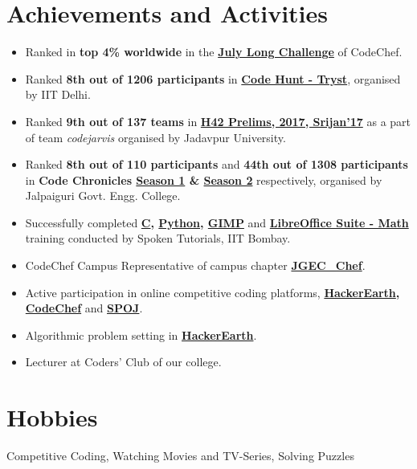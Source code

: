 \documentclass[margin, centered]{res}
\begin{document}
\begin{resume}
\begin{itemize}[leftmargin=*]
\end{itemize}


\section{Achievements and Activities}
\begin{itemize}[leftmargin=*]
	\item
	Ranked in \textbf{top 4\% worldwide} in the \textbf{\href{https://www.codechef.com/JULY17}{July Long Challenge}} of CodeChef.
	\item
	Ranked \textbf{8th out of 1206 participants} in \textbf{\href{https://www.hackerearth.com/challenge/college/code-hunt-tryst/leaderboard/}{Code Hunt - Tryst}}, organised by IIT Delhi.
	\item
	Ranked \textbf{9th out of 137 teams} in \textbf{\href{https://www.hackerrank.com/contests/h42-prelims-srijan17/leaderboard}{H42 Prelims, 2017, Srijan'17}} as a part of team \emph{codejarvis} organised by Jadavpur University.
	\item
	Ranked \textbf{8th out of 110 participants} and \textbf{44th out of 1308 participants} in \textbf{Code Chronicles \href{https://www.hackerearth.com/challenge/college/cc1/leaderboard/}{Season 1} \& \href{https://www.hackerearth.com/challenge/college/cc2/leaderboard/}{Season 2}} respectively, organised by Jalpaiguri Govt. Engg. College.
	\item
	Successfully completed \textbf{\href{https://goo.gl/NxdY6T}{C}, \href{https://goo.gl/mLoMF3}{Python}, \href{https://goo.gl/rQg0Dz}{GIMP}} and \textbf{\href{https://goo.gl/i67WIz}{LibreOffice Suite - Math}} training conducted by Spoken Tutorials, IIT Bombay.
	\item
	CodeChef Campus Representative of campus chapter \textbf{\href{https://www.codechef.com/campus_chapter/JGEC_Chef}{JGEC\_Chef}}.
	\item
	Active participation in online competitive coding platforms, \textbf{\href{https://www.hackerearth.com/@abhisek17}{HackerEarth}, \href{https://www.codechef.com/users/abhisek_ch}{CodeChef}} and \textbf{\href{http://www.spoj.com/users/abhisekssp4025/}{SPOJ}}.
	\item
	Algorithmic problem setting in \textbf{\href{https://hackerearth.com}{HackerEarth}}.
	\item
	Lecturer at Coders' Club of our college.
\end{itemize}

\section{Hobbies}
Competitive Coding, Watching Movies and TV-Series, Solving Puzzles
\end{resume}
\end{document}
